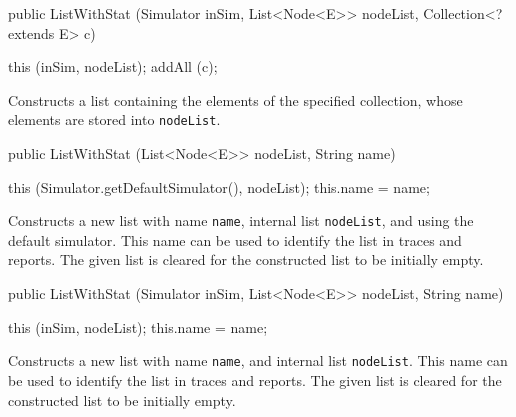 \begin{code}

   public ListWithStat (Simulator inSim, List<Node<E>> nodeList,
                        Collection<? extends E> c)\begin{hide} {
      this (inSim, nodeList);
      addAll (c);
   }\end{hide}
\end{code}
\begin{tabb} Constructs a list containing the elements of the specified
   collection, whose elements are stored into \texttt{nodeList}.
\end{tabb}
\begin{htmlonly}
\end{htmlonly}
\begin{code}

   public ListWithStat (List<Node<E>> nodeList, String name)\begin{hide} {
      this (Simulator.getDefaultSimulator(), nodeList);
      this.name = name;
   }\end{hide}
\end{code}
\begin{tabb} Constructs a new list with name \texttt{name}, internal
   list \texttt{nodeList}, and using the default simulator.
   This name can be used to identify the list in traces and reports.
   The given list is cleared for the constructed list to be initially empty.
\end{tabb}
\begin{htmlonly}
\end{htmlonly}
\begin{code}

   public ListWithStat (Simulator inSim, List<Node<E>> nodeList,
                        String name)\begin{hide} {
      this (inSim, nodeList);
      this.name = name;
   }\end{hide}
\end{code}
\begin{tabb} Constructs a new list with name \texttt{name}, and
  internal list \texttt{nodeList}.
   This name can be used to identify the list in traces and reports.
  The given list is cleared for the constructed list to be initially empty.
\end{tabb}
